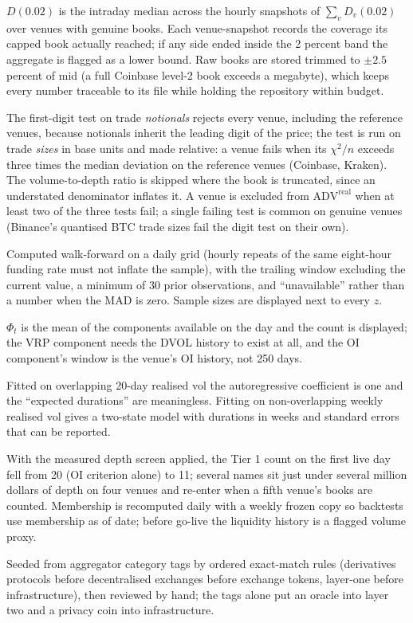 \documentclass[11pt,a4paper]{article}
\theoremstyle{definition}
\begin{document}
\begin{description}[style=nextline,nosep]
\item[Depth.] $D(0.02)$ is the intraday median across the hourly snapshots of $\sum_v D_v(0.02)$ over venues with genuine books. Each venue-snapshot records the coverage its capped book actually reached; if any side ended inside the 2 percent band the aggregate is flagged as a lower bound. Raw books are stored trimmed to $\pm 2.5$ percent of mid (a full Coinbase level-2 book exceeds a megabyte), which keeps every number traceable to its file while holding the repository within budget.
\item[Wash filters.] The first-digit test on trade \emph{notionals} rejects every venue, including the reference venues, because notionals inherit the leading digit of the price; the test is run on trade \emph{sizes} in base units and made relative: a venue fails when its $\chi^2/n$ exceeds three times the median deviation on the reference venues (Coinbase, Kraken). The volume-to-depth ratio is skipped where the book is truncated, since an understated denominator inflates it. A venue is excluded from $\mathrm{ADV}^{\mathrm{real}}$ when at least two of the three tests fail; a single failing test is common on genuine venues (Binance's quantised BTC trade sizes fail the digit test on their own).
\item[Robust $z$-scores.] Computed walk-forward on a daily grid (hourly repeats of the same eight-hour funding rate must not inflate the sample), with the trailing window excluding the current value, a minimum of 30 prior observations, and ``unavailable'' rather than a number when the MAD is zero. Sample sizes are displayed next to every $z$.
\item[Fragility index with missing components.] $\Phi_t$ is the mean of the components available on the day and the count is displayed; the VRP component needs the DVOL history to exist at all, and the OI component's window is the venue's OI history, not 250 days.
\item[The switching model.] Fitted on overlapping 20-day realised vol the autoregressive coefficient is one and the ``expected durations'' are meaningless. Fitting on non-overlapping weekly realised vol gives a two-state model with durations in weeks and standard errors that can be reported.
\item[Tiering.] With the measured depth screen applied, the Tier 1 count on the first live day fell from 20 (OI criterion alone) to 11; several names sit just under several million dollars of depth on four venues and re-enter when a fifth venue's books are counted. Membership is recomputed daily with a weekly frozen copy so backtests use membership as of date; before go-live the liquidity history is a flagged volume proxy.
\item[Sectors.] Seeded from aggregator category tags by ordered exact-match rules (derivatives protocols before decentralised exchanges before exchange tokens, layer-one before infrastructure), then reviewed by hand; the tags alone put an oracle into layer two and a privacy coin into infrastructure.
\end{description}
\end{document}
